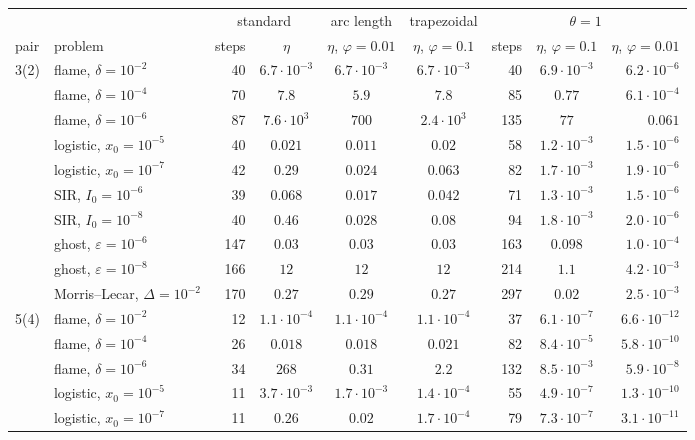 \begin{tabular}{llrcccrcr}
\toprule
& & \multicolumn{2}{c}{standard} & arc length & trapezoidal & \multicolumn{3}{c}{$\theta=1$}\\
\cmidrule(lr){3-4}\cmidrule(lr){7-9}
pair & problem & steps & $\eta$ & $\eta$, $\varphi=0.01$ & $\eta$, $\varphi=0.1$ & steps & $\eta$, $\varphi=0.1$ & $\eta$, $\varphi=0.01$\\
\midrule
3(2) & flame, $\delta=10^{-2}$ & 40 & $6.7\cdot10^{-3}$ & $6.7\cdot10^{-3}$ & $6.7\cdot10^{-3}$ & 40 & $6.9\cdot10^{-3}$ & $6.2\cdot10^{-6}$\\
 & flame, $\delta=10^{-4}$ & 70 & $7.8$ & $5.9$ & $7.8$ & 85 & $0.77$ & $6.1\cdot10^{-4}$\\
 & flame, $\delta=10^{-6}$ & 87 & $7.6\cdot10^{3}$ & $700$ & $2.4\cdot10^{3}$ & 135 & $77$ & $0.061$\\
 & logistic, $x_0=10^{-5}$ & 40 & $0.021$ & $0.011$ & $0.02$ & 58 & $1.2\cdot10^{-3}$ & $1.5\cdot10^{-6}$\\
 & logistic, $x_0=10^{-7}$ & 42 & $0.29$ & $0.024$ & $0.063$ & 82 & $1.7\cdot10^{-3}$ & $1.9\cdot10^{-6}$\\
 & SIR, $I_0=10^{-6}$ & 39 & $0.068$ & $0.017$ & $0.042$ & 71 & $1.3\cdot10^{-3}$ & $1.5\cdot10^{-6}$\\
 & SIR, $I_0=10^{-8}$ & 40 & $0.46$ & $0.028$ & $0.08$ & 94 & $1.8\cdot10^{-3}$ & $2.0\cdot10^{-6}$\\
 & ghost, $\varepsilon=10^{-6}$ & 147 & $0.03$ & $0.03$ & $0.03$ & 163 & $0.098$ & $1.0\cdot10^{-4}$\\
 & ghost, $\varepsilon=10^{-8}$ & 166 & $12$ & $12$ & $12$ & 214 & $1.1$ & $4.2\cdot10^{-3}$\\
 & Morris--Lecar, $\Delta=10^{-2}$ & 170 & $0.27$ & $0.29$ & $0.27$ & 297 & $0.02$ & $2.5\cdot10^{-3}$\\
\midrule
5(4) & flame, $\delta=10^{-2}$ & 12 & $1.1\cdot10^{-4}$ & $1.1\cdot10^{-4}$ & $1.1\cdot10^{-4}$ & 37 & $6.1\cdot10^{-7}$ & $6.6\cdot10^{-12}$\\
 & flame, $\delta=10^{-4}$ & 26 & $0.018$ & $0.018$ & $0.021$ & 82 & $8.4\cdot10^{-5}$ & $5.8\cdot10^{-10}$\\
 & flame, $\delta=10^{-6}$ & 34 & $268$ & $0.31$ & $2.2$ & 132 & $8.5\cdot10^{-3}$ & $5.9\cdot10^{-8}$\\
 & logistic, $x_0=10^{-5}$ & 11 & $3.7\cdot10^{-3}$ & $1.7\cdot10^{-3}$ & $1.4\cdot10^{-4}$ & 55 & $4.9\cdot10^{-7}$ & $1.3\cdot10^{-10}$\\
 & logistic, $x_0=10^{-7}$ & 11 & $0.26$ & $0.02$ & $1.7\cdot10^{-4}$ & 79 & $7.3\cdot10^{-7}$ & $3.1\cdot10^{-11}$\\

\end{tabular}

